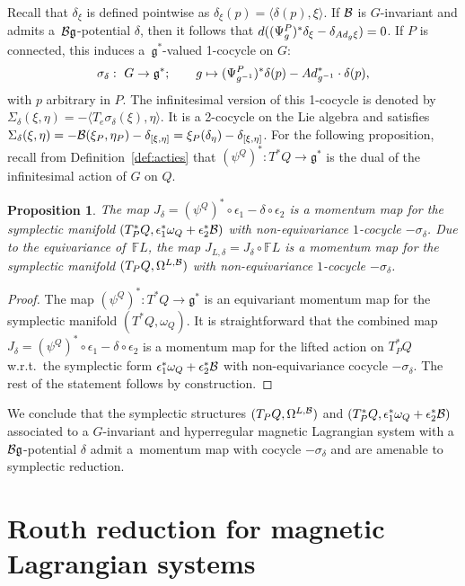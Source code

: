 \documentclass[11pt]{article}
\newtheorem{proposition}{Proposition}
\newcommand{\B}{{\cal B}}
\newcommand{\e}{\epsilon}
\newcommand{\lag}{\mathfrak{g}}
\newcommand{\F}{\mathbb{F}}
\newcommand{\ractie}{\psi}
\begin{document}
Recall that $\delta_\xi$ is def\/ined pointwise as $\delta_\xi(p) = \langle \delta(p),\xi\rangle$. If $\B$ is $G$-invariant and admits a~$\B\lag$-potential $\delta$, then it follows that $d((\Psi^P_g)^* \delta_\xi - \delta_{{\rm Ad}_g\xi})=0$. If $P$ is connected, this induces a~$\lag^*$-valued 1-cocycle on $G$:
\[
\sigma_\delta: \ G\to \lag^{*}; \qquad g \mapsto (\Psi^{P}_{g^{-1}})^{*}\delta(p) - {\rm Ad}^{*}_{g^{-1}}\cdot \delta(p),
\]
with $p$ arbitrary in $P$. The inf\/initesimal version of this 1-cocycle is denoted by $\Sigma_\delta(\xi,\eta)=-\langle T_e\sigma_\delta(\xi),\eta\rangle$. It is a 2-cocycle on the Lie algebra and satisf\/ies  $\Sigma_\delta(\xi,\eta)= -\B(\xi_{P},\eta_{P})-\delta_{[\xi,\eta]} = \xi_P(\delta_\eta)-\delta_{[\xi,\eta]}$. For the following proposition, recall from Def\/inition~\ref{def:acties} that $(\ractie^Q)^*: T^*Q \to \lag^*$ is the dual of the inf\/initesimal action of $G$ on $Q$.

\begin{proposition}\label{prop:equiv} The map $J_\delta=(\ractie^Q)^*\circ\e_{1}-\delta\circ\e_{2}$ is a momentum map for the symplectic manifold $(T_P^*Q,\e^*_1\omega_Q +\e^*_2 \B)$ with non-equivariance $1$-cocycle $-\sigma_\delta$. Due to the equivariance of~$\F L$, the map $J_{L,\delta}= J_\delta\circ \F L$ is a momentum map for the symplectic manifold $(T_PQ,\Omega^{L,\B})$ with non-equivariance $1$-cocycle $-\sigma_\delta$. \end{proposition}
\begin{proof}
The map $(\ractie^Q)^*: T^*Q\to \lag^*$ is an equivariant momentum map for the symplectic manifold $(T^*Q,\omega_Q)$. It is straightforward that the combined map $J_\delta=(\ractie^Q)^*\circ\e_{1}-\delta\circ\e_{2}$ is a momentum map for the lifted action on $T^{*}_{P}Q$ w.r.t.\ the symplectic form $\e_{1}^{*}\omega_{Q} + \e_{2}^{*}\B$ with non-equivariance cocycle $-\sigma_\delta$. The rest of the statement follows by construction.
\end{proof}

We conclude that the symplectic structures $(T_PQ,\Omega^{L,\B})$ and $(T_P^*Q,\e^*_1\omega_Q +\e^*_2 \B)$ associated to a $G$-invariant and hyperregular magnetic Lagrangian system with a $\B\lag$-potential $\delta$ admit a~momentum map with cocycle $-\sigma_\delta$ and are amenable to symplectic reduction.

\section{Routh reduction for magnetic Lagrangian systems}\label{section5}
\end{document}
